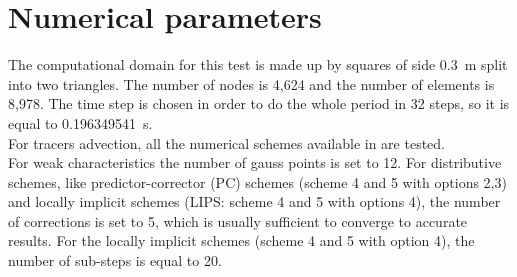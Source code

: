 \section{Numerical parameters}
%
The computational domain for this test is made up by squares of side 0.3~m split into two triangles.
The number of nodes is 4,624 and the number of elements is 8,978.
The time step is chosen in order to do the whole period in 32 steps, so it is equal to 0.196349541~s.
\\
For tracers advection, all the numerical schemes available in  are tested. \\
For weak characteristics the number of gauss points is set to 12. For distributive schemes, like predictor-corrector (PC) schemes (scheme 4 and 5 with options 2,3) and locally implicit schemes (LIPS: scheme 4 and 5 with options 4), the number of corrections is set to 5, which is usually sufficient to converge to accurate results. For the locally implicit schemes (scheme 4 and 5 with option 4), the number of sub-steps is equal to 20.
%
%
%
